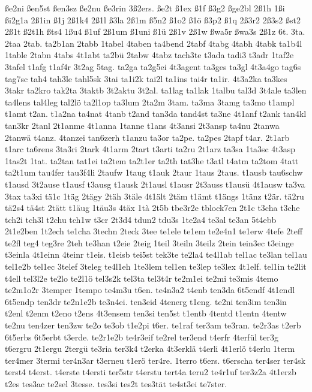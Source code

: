 {ße2ni
ßen5st
ßen3sz
ße2nu
ße3rin
3ß2ers.
ße2t
ß1ex
ß1f
ß3g2
ßge2bl
2ß1h
1ßi
ßi2g1a
2ß1in
ß1j
2ß1k4
2ß1l
ß3la
2ß1m
ß5n2
ß1o2
ß1ö
ß3p2
ß1q
2ß3r2
2ß3s2
ßst2
2ß1t
ß2t1h
ßts4
1ßu4
ß1uf
2ß1um
ß1uni
ß1ü
2ß1v
2ß1w
ßwa5r
ßwa3s
2ß1z
6t.
3ta.
2taa
2tab.
ta2b1an
2tabb
1tabel
4taben
ta4bend
2tabf
4tabg
4tabh
4tabk
ta1b4l
1table
2tabn
4tabs
4t1abt
ta2bü
2tabw
4tabz
tach3te
t3ada
tadi3
t3adr
1taf2e
3tafel
t1afg
t1af4r
3t2ag
5tag.
ta2ga
ta2g5ei
4t3agent
ta3ges
ta3gl
4t3a4go
tag6s
tag7sc
tah4
tah3le
tahl5sk
3tai
ta1i2k
tai2l
ta1ins
tai4r
ta1ir.
4t3a2ka
ta3kes
3takr
ta2kro
tak2ta
3taktb
3t2aktu
3t2al.
ta1lag
ta1lak
1talbu
tal3d
3t4ale
ta3len
ta4lens
tal4leg
tal2lö
ta2l1op
ta3lum
2ta2m
3tam.
ta3ma
3tamg
ta3mo
t1ampl
t1amt
t2an.
t1a2na
ta4nat
4tanb
t2and
tan3da
tand4st
ta3ne
4t1anf
t2ank
tan4kl
tan3kr
2tanl
2t1anme
4t1anna
1tanne
t1ans
4t3ansi
2t3ansp
ta4nu
2tanwa
2tanwä
t4anz.
4tanzei
tan6zerh
t1anzu
ta3or
ta2pe.
ta2pes
2tapf
t4ar.
2t1arb
t1arc
ta6rens
3ta3ri
2tark
4t1arm
2tart
t3arti
ta2ru
2t1arz
ta3sa
1ta3sc
4t3asp
1tas2t
1tat.
ta2tan
tat1ei
ta2tem
ta2t1er
ta2th
tat3he
t3atl
t4atm
ta2tom
4tatt
ta2t1um
tau4fer
tau3f4li
2taufw
1taug
t1auk
2taur
1taus
2taus.
t1ausb
tau6schw
t1ausd
3t2ause
t1ausf
t3ausg
t1ausk
2t1ausl
t1ausr
2t3auss
t1ausü
4t1ausw
ta3va
3tax
ta3xi
tä1c
1täg
2tägy
2täh
3täle
4t1ält
2täm
t1ämt
t1ängs
1tänz
t2är.
tä2ru
tä2s4
tä4st
2tätt
t1äug
1täu3s
4täx
1tà
2t5b
tbe3r2e
tblock7en
2t1c
t3cha
t3che
tch2i
tch3l
t2chu
tch1w
t3cr
2t3d4
tdun2
tdu3s
1te2a4
te3al
te3an
5t4ebb
2t1e2ben
1t2ech
te1cha
3techn
2teck
3tee
te1ele
te1em
te2e4n1
te1erw
4tefe
2teff
te2fl
teg4
teg3re
2teh
te3han
t2eie
2teig
1teil
3teiln
3teilz
2tein
tein3ec
t3einge
t3einla
4t1einn
4teinr
t1eis.
t1eisb
tei5st
tek3te
te2la4
te4l1ab
tel1ac
te3lan
tel1au
tel1e2b
tel1ec
3telef
3teleg
te4l1eh
1te3lem
tel1en
te3lep
te3lex
4t1elf.
tel1in
te2lit
t4ell
tel3l2e
te2lo
te2l1ö
tel3s2k
tel3ta
tel3t4r
te2m1ei
te2mi
te3mis
4temo
te2m1o2r
3temper
1tempo
te4m3u
t6en.
te4n3a2
t4enb
ten3da
6t5endf
4t1endl
6t5endp
ten3dr
te2n1e2b
te3n4ei.
ten3eid
4tenerg
t1eng.
te2ni
ten3im
ten3in
t2enl
t2enm
t2eno
t2ens
4t3ensem
ten3si
ten5st
t1entb
4tentd
t1entn
4tentw
te2nu
ten4zer
ten3zw
te2o
te3ob
t1e2pi
t6er.
te1raf
ter3am
te3ran.
te2r3as
t2erb
6t5erbs
6t5erbt
t3erde.
te2r1e2b
te4r3eif
te2rel
ter3end
t4erfr
4terfül
ter3g
t6ergru
2t1ergu
2tergü
te3ria
ter3k4
t2erka
4t3erklä
t4erli
4t1erlö
t4erlu
1term
ter4mer
3termi
ter4n3ar
t3erneu
t1erö
ter4re.
1terro
t6ers.
t6erscha
ter4ser
ter4sk
terst4
t4erst.
t4erste
t4ersti
ter5str
t4erstu
tert4a
teru2
te4r1uf
ter3z2a
4t1erzb
t2es
tes3ac
te2sel
3tesse.
tes3si
tes2t
tes3tät
te4st3ei
te7ster.
}
